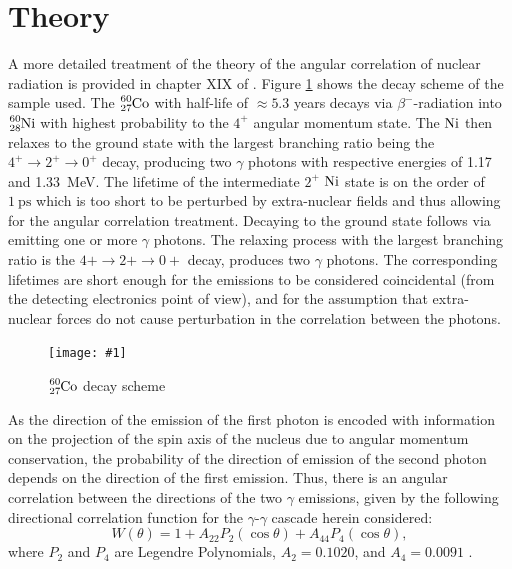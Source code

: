 \documentclass[twocolumn]{article}
\newcommand{\insertFigure}[1]{%
   \texttt{[image: \#1]}%
}
\begin{document}
\section{Theory}
A more detailed treatment of the theory of the angular correlation of nuclear radiation is provided in chapter XIX of \cite{sieg}. Figure \ref{fig:cobalt_scheme} shows the decay scheme of the sample used. The $\ce{_27^{60}Co}$ with half-life of $\approx 5.3$ years decays via $\beta^-$-radiation into $\ce{_28^{60}Ni}$ with highest probability to the $4^+$ angular momentum state.
The $\ce{Ni}$ then relaxes to the ground state with the largest branching ratio being the $4^+\rightarrow2^+\rightarrow 0^+$ decay, producing two $\gamma$ photons with respective energies of 1.17 and 1.33~MeV. The lifetime of the intermediate $2^+$ $\ce{Ni}$ state is on the order of $\SI{1}{\pico\second}$ which is too short to be perturbed by extra-nuclear fields and thus allowing for the angular correlation treatment.
Decaying to the ground state follows via emitting one or more $\gamma$ photons. The relaxing process with the largest branching ratio is the $4+ \rightarrow 2+ \rightarrow 0+$ decay, produces two $\gamma$ photons. The corresponding lifetimes are short enough for the emissions to be considered coincidental (from the detecting electronics point of view), and for the assumption that extra-nuclear forces do not cause perturbation in the correlation between the photons.
\begin{figure}[!h]
\centering
\insertFigure{cobalt_scheme.png}
\caption{$\ce{_27^{60}Co}$ decay scheme \cite{cobalt_scheme}}
\label{fig:cobalt_scheme}
\end{figure}
As the direction of the emission of the first photon is encoded with information on the projection of the spin axis of the nucleus due to angular momentum conservation, the probability of the direction of emission of the second photon depends on the direction of the first emission. Thus, there is an angular correlation between the directions of the two $\gamma$ emissions, given by the following directional correlation function for the $\gamma$-$\gamma$ cascade herein considered:
\[W(\theta) = 1+A_{22}P_2(\cos{\theta})+A_{44}P_4(\cos{\theta}),\]
where $P_2$ and $P_4$ are Legendre Polynomials, $A_2 = 0.1020$, and $A_4 = 0.0091$ \cite{sieg}.
\end{document}
